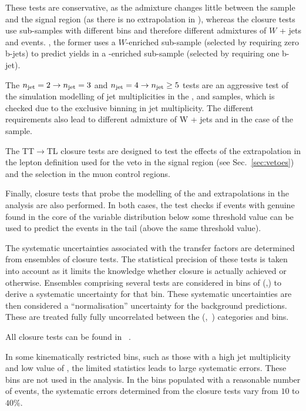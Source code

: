 These tests are conservative, as the admixture changes little between the \mj sample and the signal region 
(as there is no extrapolation in \nb), whereas the closure tests use sub-samples with different \nb bins and
therefore different admixtures of $W$ + jets and \ttbar events. \eg, the former uses a $W$-enriched sub-sample (selected by requiring zero
b-jets) to predict yields in a \ttbar-enriched sub-sample (selected by requiring one b-jet).

The $n_{\text{jet}}=2\rightarrow n_{\text{jet}}=3$ and $n_{\text{jet}}=4\rightarrow n_{\text{jet}}\geq5$ tests are an aggressive test of the simulation modelling of jet
multiplicities in the \mj, \mmj and \gj samples, which is checked due to the exclusive binning in jet multiplicity. The different \njet
requirements also lead to different admixture of W + jets and \ttbar in the case of the \mj sample.

The TT$\rightarrow$TL closure tests are designed to test the effects of the extrapolation in the
 lepton definition used for the veto in the signal region (see Sec.~\ref{sec:vetoes}) and the selection in the
muon control regions. 

Finally, closure tests that probe the modelling of the \alphat and \bdphi extrapolations in the analysis are also performed. 
In both cases, the test checks if events with genuine \met found in the core of the variable distribution below some 
threshold value can be used to predict the events in the tail (above the same threshold value). 


The systematic uncertainties associated with the transfer factors are determined from ensembles of closure
tests. The statistical precision of these tests is taken into account as it limits the knowledge whether closure is actually achieved or otherwise. 
Ensembles comprising several tests are considered in bins of (\njet,\scalht) to derive a systematic uncertainty for that bin. These systematic uncertainties are then considered a ``normalisation'' uncertainty for the background predictions. These are treated fully fully uncorrelated between the (\njet,~\nb)
categories and \scalht bins. 

All closure tests can be found in ~\cite{alphaTnote}.


In some kinematically restricted bins, such as those with a high jet multiplicity and low value of \scalht, the
limited statistics leads to large systematic errors. These bins are not used in the analysis. 
In the bins populated with a reasonable number of events, the systematic errors determined from the closure tests vary from $10$ to
$40\%$.


